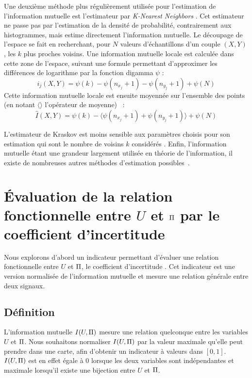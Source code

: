 \documentclass[../main]{subfiles}
\begin{document}
Une deuxième méthode plus régulièrement utilisée pour l'estimation de l'information mutuelle est l'estimateur par \emph{K-Nearest Neighbors} \parencite{2004kraskov}.
Cet estimateur ne passe pas par l'estimation de la densité de probabilité, contrairement aux histogrammes, mais estime directement l'information mutuelle.
Le découpage de l'espace se fait en recherchant, pour $N$ valeurs d'échantillons d'un couple $(X,Y)$, les $k$ plus proches voisins. Une information mutuelle locale est calculée dans cette zone de l'espace, suivant une formule permettant d'approximer les différences de logarithme par la fonction digamma $\psi$ : 
$$i_j(X,Y) = \psi(k) - \psi(n_{x_j} + 1) - \psi(n_{y_j} +1) + \psi(N)$$
Cette information mutuelle locale est ensuite moyennée sur l'ensemble des points (en notant $\langle \rangle$ l'opérateur de moyenne) ~: 
\begin{equation}\label{eq:knn}
    \hat{I}(X,Y) = \psi(k) - \langle\psi(n_{x_j} + 1) + \psi(n_{y_j} +1)\rangle + \psi(N)
\end{equation}
    
L'estimateur de Kraskov est moins sensible aux paramètres choisis pour son estimation qui sont le nombre de voisins $k$ considérés \parencite{ross_mutual_2014}.
Enfin, l'information mutuelle étant une grandeur largement utilisée en théorie de l'information, il existe de nombreuses autres méthodes d'estimation possibles~\parencite{Doquire2012ACO}.

\section{\'Evaluation de la relation fonctionnelle entre $U$ et $\Pi$ par le coefficient d'incertitude}

Nous explorons d'abord un indicateur permettant d'évaluer une relation fonctionnelle entre $U$ et $\Pi$, le coefficient d'incertitude \parencite{Theil1961EconomicFA}.
Cet indicateur est une version normalisée de l'information mutuelle et mesure une relation générale entre deux signaux.

\subsection{Définition}

L'information mutuelle $I(U,\Pi)$ mesure une relation quelconque entre les variables $U$ et $\Pi$.
Nous souhaitons normaliser $I(U,\Pi)$ par la valeur maximale qu'elle peut prendre dans une carte, afin d'obtenir un indicateur à valeurs dans $[0,1]$. 
$I(U,\Pi)$ est en effet égale à 0 lorsque les deux variables sont indépendantes et maximale lorsqu'il existe une bijection entre $U$ et $\Pi$.
\end{document}
